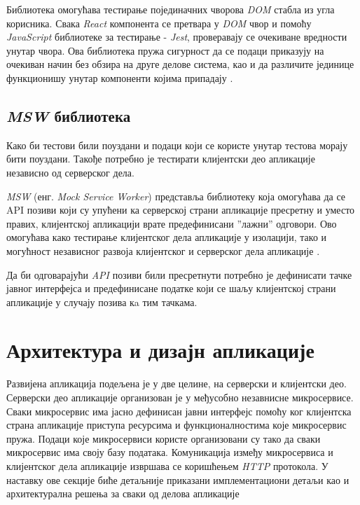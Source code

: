 \documentclass[12pt,oneside]{memoir}
\begin{document}
Библиотека омогућава тестирање појединачних чворова \textit{DOM} стабла из угла корисника. Свака \textit{React} компонента се претвара у \textit{DOM} чвор и помоћу \textit{JavaScript} библиотеке за тестирање - \textit{Jest}, проверавају се очекиване вредности унутар чвора. Ова библиотека пружа сигурност да се подаци приказују на очекиван начин без обзира на друге делове система, као и да различите јединице функционишу унутар компоненти којима припадају \cite{rtl} \cite{jest}.



\subsection{\textit{MSW} библиотека}

Како би тестови били поуздани и подаци који се користе унутар тестова морају бити поуздани. Такође потребно је тестирати клијентски део апликације независно од серверског дела. 

\textit{MSW} (енг. \textit{Mock Service Worker}) представља библиотеку која омогућава да се API позиви који су упућени ка серверској страни апликације пресретну и уместо правих, клијентској апликацији врате предефинисани ”лажни” одговори. Ово омогућава како тестирање клијентског дела апликације у изолацији, тако и могућност независног развоја клијентског и серверског дела апликације \cite{msw}.

Да би одговарајући \textit{API} позиви били пресретнути потребно је дефинисати тачке јавног интерфејса и предефинисане податке који се шаљу клијентској страни апликације у случају позива кa тим тачкама.



\section{Архитектура и дизајн апликације}

Развијена апликација подељена је у две целине, на серверски и клијентски део. Серверски део апликације организован је у међусобно незавнисне микросервисе. Сваки микросервис има јасно дефинисан јавни интерфејс помоћу ког клијентска страна апликације приступа ресурсима и функционалностима које микросервис пружа. Подаци које микросервиси користе организовани су тако да сваки микросервис има своју базу података. Комуникација између микросервиса и клијентског дела апликације извршава се коришћењем \textit{HTTP} протокола. У наставку ове секције биће детаљније приказани имплементациони детаљи као и архитектурална решења за сваки од делова апликације
\end{document}

